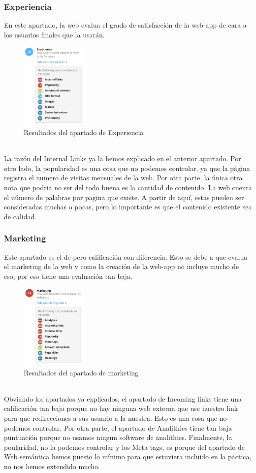 \documentclass{article}
\begin{document}
\subsubsection{Experiencia}
En este apartado, la web evalua el grado de satisfacción de la web-app de cara a los usuarios finales que la usarán.
\begin{figure}[ht]
    \centering
    \includegraphics[width=0.3\textwidth]{images/experiencia.png}
    \caption{Resultados del apartado de Experiencia}
\end{figure}\\
La razón del Internal Links ya la hemos explicado en el anterior apartado. Por otro lado, la popularidad es una cosa que no podemos controlar, ya que la página registra el numero de visitas mensuales de la web. Por otra parte, la única otra nota que podria no ser del todo buena es la cantidad de contenido. La web cuenta el número de palabras por pagina que existe. A partir de aquí, estas pueden ser consideradas muchas o pocas, pero lo importante es que el contenido existente sea de calidad. 
\newpage
\subsubsection{Marketing}
Este apartado es el de pero calificación con diferencia. Esto se debe a que evalua el marketing de la web y como la creación de la web-app no incluye mucho de eso, por eso tiene una evaluación tan baja.
\begin{figure}[ht]
    \centering
    \includegraphics[width=0.3\textwidth]{images/marketing.png}
    \caption{Resultados del apartado de marketing}
\end{figure}\\
Obviando los apartados ya explicados, el apartado de Incoming links tiene una calificación tan baja porque no hay ninguna web externa que use nuestro link para que redirecciones a sus usuario a la nuestra. Esto es una cosa que no podemos controlar. Por otra parte, el apartado de Analithics tiene tan baja puntuación porque no usamos ningun software de analithics. Finalmente, la poularidad, no la podemos controlar y los Meta tags, es porque del apartado de Web semántica hemos puesto lo mínimo para que estuviera incluido en la páctica, no nos hemos extendido mucho.
\end{document}
